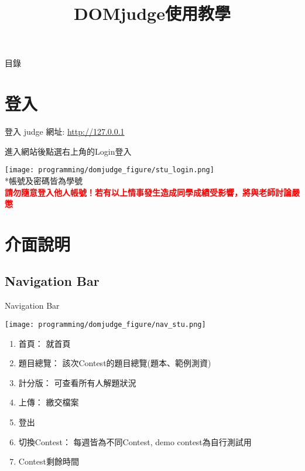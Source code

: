 \documentclass[aspectratio=169,xcolor=dvipsnames]{beamer}
\title[short title]{DOMjudge使用教學}
\author{}
\date{}
\begin{document}
    \begin{frame}
        \titlepage
    \end{frame}

    \begin{frame}{目錄}
        \tableofcontents
    \end{frame}

    \section{登入}

    \begin{frame}{登入}
        judge 網址: \url{http://127.0.0.1} \par
        
        \vspace{1em}
        進入網站後點選右上角的Login登入 \par
        \texttt{[image: programming/domjudge\_figure/stu\_login.png]} \\
        *帳號及密碼皆為學號 \\
        \vspace{1em}
        \textbf{\textcolor{red}{請勿隨意登入他人帳號！若有以上情事發生造成同學成績受影響，將與老師討論嚴懲}}
        
    \end{frame}

    \section{介面說明}
    
    \subsection{Navigation Bar}
    \begin{frame}{Navigation Bar}
        \centerline{\texttt{[image: programming/domjudge\_figure/nav\_stu.png]}}
        \begin{enumerate}
            \item 首頁： 就\;首頁
            \item 題目總覽： 該次Contest的題目總覽(題本、範例測資)
            \item 計分版： 可查看所有人解題狀況
            \item 上傳： 繳交檔案
            \item 登出
            \item 切換Contest： 每週皆為不同Contest, demo contest為自行測試用
            \item Contest剩餘時間
        \end{enumerate}
    \end{frame}
    
\end{document}
